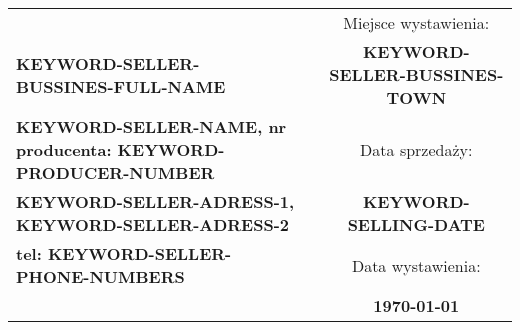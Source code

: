 \documentclass[a4paper]{book}
\begin{document}

\begin{table}[H]
\begin{tabularx}{\textwidth}{X c c}
\cline{3-3}
                                                 &  & \cellcolor[HTML]{C0C0C0}Miejsce wystawienia: \\
\centering\textbf{KEYWORD-SELLER-BUSSINES-FULL-NAME} &  & \textbf{KEYWORD-SELLER-BUSSINES-TOWN}                              \\ \cline{3-3} 
\centering\textbf{KEYWORD-SELLER-NAME, nr producenta: KEYWORD-PRODUCER-NUMBER} &  & \cellcolor[HTML]{C0C0C0}Data sprzedaży:      \\
\centering\textbf{KEYWORD-SELLER-ADRESS-1, KEYWORD-SELLER-ADRESS-2}     &  & \textbf{KEYWORD-SELLING-DATE}                     \\ \cline{3-3} 
\centering\textbf{tel: KEYWORD-SELLER-PHONE-NUMBERS}                 &  & \cellcolor[HTML]{C0C0C0}Data wystawienia:    \\
                                                 &  & \textbf{\today}                     \\ \cline{3-3} 
\end{tabularx}
\end{table}

\end{document}
